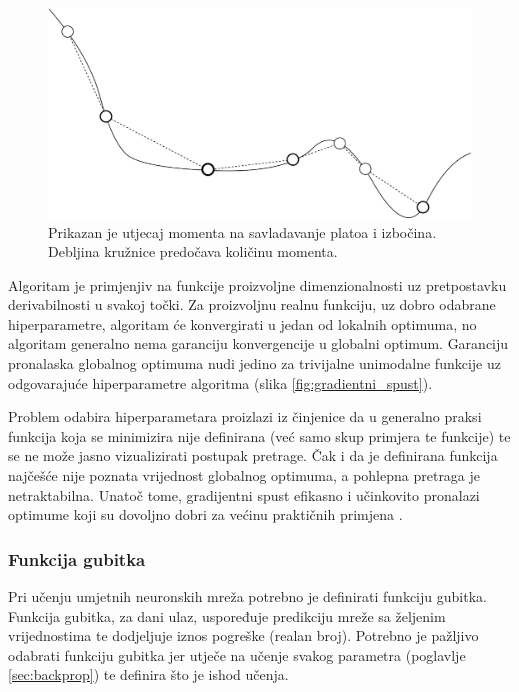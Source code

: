 \documentclass[times, utf8, numeric, diplomski]{fer}
\def\figref#1{(slika \ref{#1})}
\def\secref#1{(poglavlje \ref{#1})}
\begin{document}
\begin{figure}[H]
\centering
\includegraphics[scale=0.6]{grad_descent_moment.pdf}
\caption{Prikazan je utjecaj momenta na savladavanje platoa i izbočina. Debljina kružnice predočava količinu momenta.}
\label{fig:visoravan}
\end{figure}

Algoritam je primjenjiv na funkcije proizvoljne dimenzionalnosti uz pretpostavku derivabilnosti u svakoj točki. Za proizvoljnu realnu funkciju, uz dobro odabrane hiperparametre, algoritam će konvergirati u jedan od lokalnih optimuma, no algoritam generalno nema garanciju konvergencije u globalni optimum. Garanciju pronalaska globalnog optimuma nudi jedino za trivijalne unimodalne funkcije uz odgovarajuće hiperparametre algoritma \figref{fig:gradientni_spust}.

Problem odabira hiperparametara proizlazi iz činjenice da u generalno praksi funkcija koja se minimizira nije definirana (već samo skup primjera te funkcije) te se ne može jasno vizualizirati postupak pretrage. Čak i da je definirana funkcija najčešće nije poznata vrijednost globalnog optimuma, a pohlepna pretraga je netraktabilna. Unatoč tome, gradijentni spust efikasno i učinkovito pronalazi optimume koji su dovoljno dobri za većinu praktičnih primjena \citep{yolo}.

\subsubsection{Funkcija gubitka}
Pri učenju umjetnih neuronskih mreža potrebno je definirati funkciju gubitka. Funkcija gubitka, za dani ulaz, uspoređuje predikciju mreže sa željenim vrijednostima te dodjeljuje iznos pogreške (realan broj). Potrebno je pažljivo odabrati funkciju gubitka jer utječe na učenje svakog parametra \secref{sec:backprop} te definira što je ishod učenja. 
\end{document}
